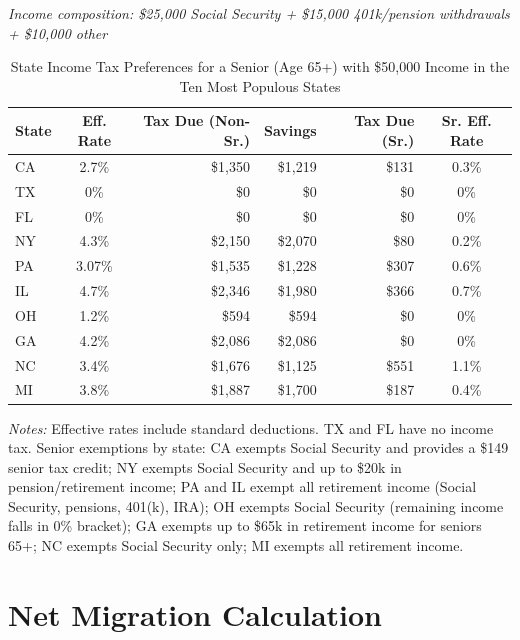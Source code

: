 \documentclass[11pt]{article}
\begin{document}
\begin{table}[htbp!]
    \centering
    \caption{State Income Tax Preferences for a Senior (Age 65+) with \$50,000 Income in the Ten Most Populous States}
    \label{tab:senior_tax_prefs}
    \smallskip
    \small
    \textit{Income composition: \$25,000 Social Security + \$15,000 401k/pension withdrawals + \$10,000 other}
    \vspace{0.5em}

    \begin{tabular}{l c r r r c}
    \toprule
    \textbf{State} & \textbf{Eff. Rate} & \textbf{Tax Due (Non-Sr.)} & \textbf{Savings} & \textbf{Tax Due (Sr.)} & \textbf{Sr. Eff. Rate} \\
    \midrule
    CA & 2.7\%  & \$1,350 & \$1,219 & \$131 & 0.3\% \\
    TX & 0\%    & \$0     & \$0     & \$0   & 0\% \\
    FL & 0\%    & \$0     & \$0     & \$0   & 0\% \\
    NY & 4.3\%  & \$2,150 & \$2,070 & \$80  & 0.2\% \\
    PA & 3.07\% & \$1,535 & \$1,228 & \$307 & 0.6\% \\
    IL & 4.7\%  & \$2,346 & \$1,980 & \$366 & 0.7\% \\
    OH & 1.2\%  & \$594   & \$594   & \$0   & 0\% \\
    GA & 4.2\%  & \$2,086 & \$2,086 & \$0   & 0\% \\
    NC & 3.4\%  & \$1,676 & \$1,125 & \$551 & 1.1\% \\
    MI & 3.8\%  & \$1,887 & \$1,700 & \$187 & 0.4\% \\
    \bottomrule
    \end{tabular}

    \vspace{0.5em}
    \raggedright
    \footnotesize
    \textit{Notes:} Effective rates include standard deductions. TX and FL have no income tax. Senior exemptions by state: CA exempts Social Security and provides a \$149 senior tax credit; NY exempts Social Security and up to \$20k in pension/retirement income; PA and IL exempt all retirement income (Social Security, pensions, 401(k), IRA); OH exempts Social Security (remaining income falls in 0\% bracket); GA exempts up to \$65k in retirement income for seniors 65+; NC exempts Social Security only; MI exempts all retirement income.
\end{table}

\section{Net Migration Calculation}
\label{app:netmig_calculation}
\end{document}
